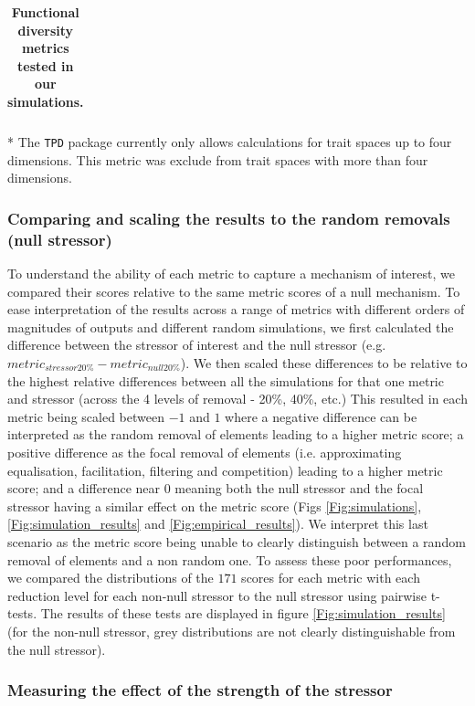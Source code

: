 \documentclass[12pt,letterpaper]{article}
\begin{document}
\begin{table}[htbp]
\begin{tabular}{p{0.1\linewidth}|p{0.15\linewidth}|p{0.15\linewidth}|p{0.2\linewidth}|p{0.15\linewidth}|p{0.1\linewidth}}
\end{tabular}
\caption{\scriptsize{\textbf{Functional diversity metrics tested in our simulations.}}
}
\label{Tab:metrics}
* The \texttt{TPD} package currently only allows calculations for trait spaces up to four dimensions. This metric was exclude from trait spaces with more than four dimensions.
\end{table}

\subsubsection{Comparing and scaling the results to the random removals (null stressor)}

To understand the ability of each metric to capture a mechanism of interest, we compared their scores relative to the same metric scores of a null mechanism.
To ease interpretation of the results across a range of metrics with different orders of magnitudes of outputs and different random simulations, we first calculated the difference between the stressor of interest and the null stressor (e.g. $metric_{stressor20\%} - metric_{null20\%}$).
We then scaled these differences to be relative to the highest relative differences between all the simulations for that one metric and stressor (across the 4 levels of removal - 20\%, 40\%, etc.)
This resulted in each metric being scaled between $-1$ and $1$ where a negative difference can be interpreted as the random removal of elements leading to a higher metric score; a positive difference as the focal removal of elements (i.e. approximating equalisation, facilitation, filtering and competition) leading to a higher metric score; and a difference near $0$ meaning both the null stressor and the focal stressor having a similar effect on the metric score (Figs \ref{Fig:simulations}, \ref{Fig:simulation_results} and \ref{Fig:empirical_results}).
We interpret this last scenario as the metric score being unable to clearly distinguish between a random removal of elements and a non random one.
To assess these poor performances, we compared the distributions of the $171$ scores for each metric with each reduction level for each non-null stressor to the null stressor using pairwise t-tests.
The results of these tests are displayed in figure \ref{Fig:simulation_results} (for the non-null stressor, grey distributions are not clearly distinguishable from the null stressor).

\subsubsection{Measuring the effect of the strength of the stressor}
\end{document}
